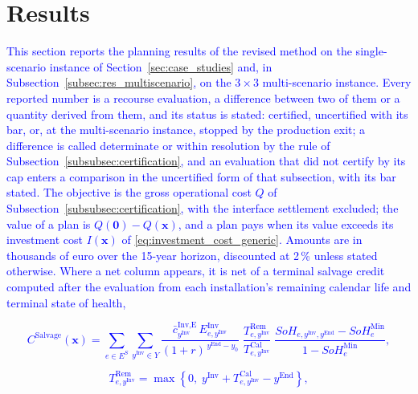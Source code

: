\documentclass[preprint,12pt]{elsarticle}
\begin{document}
\section{Results}
\label{sec:results}

\textcolor{blue}{
    This section reports the planning results of the revised method on the single-scenario instance of Section~\ref{sec:case_studies} and, in Subsection~\ref{subsec:res_multiscenario}, on the $3 \times 3$ multi-scenario instance. 
    Every reported number is a recourse evaluation, a difference between two of them or a quantity derived from them, and its status is stated: certified, uncertified with its bar, or, at the multi-scenario instance, stopped by the production exit;
    a difference is called determinate or within resolution by the rule of Subsection~\ref{subsubsec:certification}, and an evaluation that did not certify by its cap enters a comparison in the uncertified form of that subsection, with its bar stated. The objective is the gross operational cost $Q$ of Subsection~\ref{subsubsec:certification}, with the interface settlement excluded; the value of a plan is $Q(\boldsymbol{0}) - Q(\boldsymbol{x})$, and a plan pays when its value exceeds its investment cost $I(\boldsymbol{x})$ of \eqref{eq:investment_cost_generic}. Amounts are in thousands of euro over the 15-year horizon, discounted at 2\,\% unless stated otherwise. Where a net column appears, it is net of a terminal salvage credit computed after the evaluation from each installation's remaining calendar life and terminal state of health,
}

\textcolor{blue}{
    \begin{equation}
        C^\text{Salvage}(\boldsymbol{x}) =
        \sum_{e \in E^S} \sum_{y^\text{Inv} \in Y}
        \frac{\bar{c}^{\text{Inv,E}}_{y^\text{Inv}}\, E^{\text{Inv}}_{e,y^\text{Inv}}}{(1+r)^{\,y^\text{End}-y_0}}
        \;\frac{T^\text{Rem}_{e,y^\text{Inv}}}{T^\text{Cal}_{e,y^\text{Inv}}}
        \;\frac{SoH_{e,y^\text{Inv},y^\text{End}} - SoH^{\text{Min}}_e}{1 - SoH^{\text{Min}}_e},
        \label{eq:salvage_credit}
    \end{equation}
}

\textcolor{blue}{
    \begin{equation}
        T^\text{Rem}_{e,y^\text{Inv}} = \max\left\{0,\; y^\text{Inv} + T^\text{Cal}_{e,y^\text{Inv}} - y^\text{End}\right\},
        \label{eq:salvage_remaining_life}
    \end{equation}
}
\end{document}
